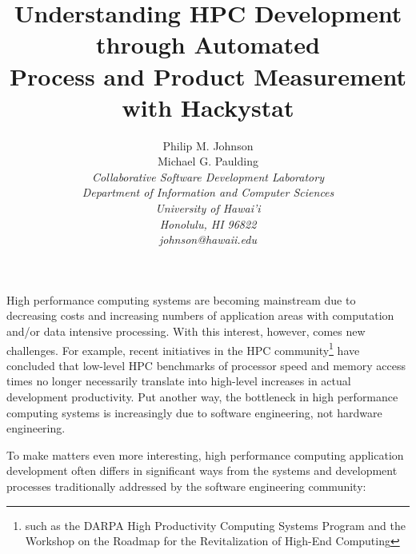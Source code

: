 \documentclass[times,10pt,twocolumn]{article}
\begin{document}
\title{Understanding HPC Development through Automated \\Process and Product Measurement with Hackystat}


\author{Philip M. Johnson \\ Michael G. Paulding \\
\em  Collaborative Software Development Laboratory \\
\em  Department of Information and Computer Sciences \\
\em  University of Hawai'i \\
\em  Honolulu, HI 96822 \\
\em  johnson@hawaii.edu}
\maketitle
\thispagestyle{empty}


\label{sec:intro}

High performance computing systems are becoming mainstream due to
decreasing costs and increasing numbers of application areas with
computation and/or data intensive processing.  With this interest,
however, comes new challenges. For example, recent initiatives in the
HPC community\footnote{such as the DARPA High Productivity Computing
Systems Program and the Workshop on the Roadmap for the Revitalization
of High-End Computing} have concluded that low-level HPC benchmarks of
processor speed and memory access times no longer necessarily
translate into high-level increases in actual development
productivity.  Put another way, the bottleneck in high performance
computing systems is increasingly due to software engineering, not
hardware engineering.

To make matters even more interesting, high performance computing
application development often differs in significant ways from the systems
and development processes traditionally addressed by the software
engineering community:
\end{document}

